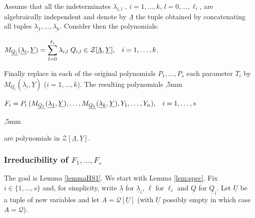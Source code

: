 \documentclass[11pt,a4paper,reqno]{amsart}
\theoremstyle{definition}
\begin{document}
Assume that 
all the indeterminates $\lambda_{i,l}$ , $i=1,\ldots,k$, $l=0,\ldots,\ell_i$, are algebraically independent and denote by $\underline{\Lambda}$ the tuple obtained by concatenating all tuples $\underline{\lambda_1}, \ldots, \underline{\lambda_k}$. Consider then the polynomials:

\vskip 1mm

\centerline{$\displaystyle M_{\underline {Q_i}}({\underline{\lambda_i}}, \underline Y) = \sum_{l=0}^{\ell_i} \lambda_{i,l} \hskip 1mm Q_{i,l}\in {\mathcal Z}[\underline \Lambda,\underline Y], \hskip 3mm i=1,\ldots,k$.}
\vskip 1mm

\noindent
Finally replace in each of the original polynomials $P_1,\ldots,P_s$ each parameter $T_i$ by $M_{\underline {Q_i}}({\underline{\lambda_i}}, \underline Y)$ ($i=1,\ldots,k$). 
The resulting polynomials
,5mm

\centerline{$F_i = P_i\hskip 2pt (M_{\underline {Q_1}}({\underline{\lambda_1}}, \underline Y), \ldots, M_{\underline {Q_k}}({\underline{\lambda_k}}, \underline Y),Y_1, \ldots, Y_n),\hskip 3mm i=1,\ldots,s$}
,5mm

\noindent
are polynomials in ${\mathcal Z}[\underline{\Lambda}, \underline Y]$. 

\subsubsection{Irreducibility of $F_1,\ldots,F_s$} The goal is Lemma \ref{lemmaHS1}. We start with Lemma \ref{lem:spec}. Fix $i\in \{1,\dots, s\}$ and, for simplicity, write $\underline{\lambda}$ for $\underline{\lambda}_i$, $\ell$ for $\ell_i$ and $\underline{Q}$ for $\underline{Q}_i$. Let $\underline U$ be a tuple of new variables and let $A=\mathcal{Q}[\underline{U}]$ (with $\underline U$ possibly empty in which case $A=\mathcal{Q}$).
\end{document}
